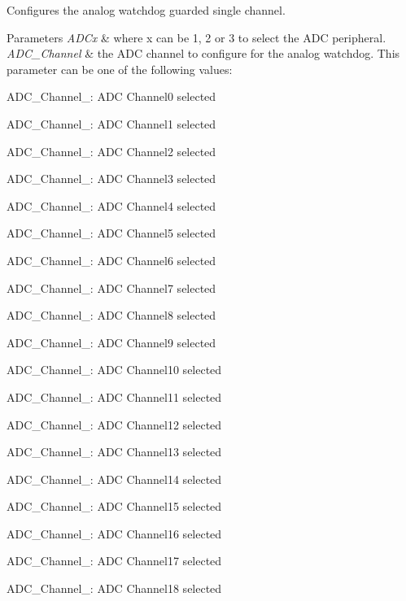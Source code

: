 Configures the analog watchdog guarded single channel. 


\begin{DoxyParams}{Parameters}
{\em A\+D\+Cx} & where x can be 1, 2 or 3 to select the A\+D\+C peripheral. \\
\hline
{\em A\+D\+C\+\_\+\+Channel} & the A\+D\+C channel to configure for the analog watchdog. This parameter can be one of the following values\+: \begin{DoxyItemize}
\item A\+D\+C\+\_\+\+Channel\+\_\+: A\+D\+C Channel0 selected \item A\+D\+C\+\_\+\+Channel\+\_\+: A\+D\+C Channel1 selected \item A\+D\+C\+\_\+\+Channel\+\_\+: A\+D\+C Channel2 selected \item A\+D\+C\+\_\+\+Channel\+\_\+: A\+D\+C Channel3 selected \item A\+D\+C\+\_\+\+Channel\+\_\+: A\+D\+C Channel4 selected \item A\+D\+C\+\_\+\+Channel\+\_\+: A\+D\+C Channel5 selected \item A\+D\+C\+\_\+\+Channel\+\_\+: A\+D\+C Channel6 selected \item A\+D\+C\+\_\+\+Channel\+\_\+: A\+D\+C Channel7 selected \item A\+D\+C\+\_\+\+Channel\+\_\+: A\+D\+C Channel8 selected \item A\+D\+C\+\_\+\+Channel\+\_\+: A\+D\+C Channel9 selected \item A\+D\+C\+\_\+\+Channel\+\_\+: A\+D\+C Channel10 selected \item A\+D\+C\+\_\+\+Channel\+\_\+: A\+D\+C Channel11 selected \item A\+D\+C\+\_\+\+Channel\+\_\+: A\+D\+C Channel12 selected \item A\+D\+C\+\_\+\+Channel\+\_\+: A\+D\+C Channel13 selected \item A\+D\+C\+\_\+\+Channel\+\_\+: A\+D\+C Channel14 selected \item A\+D\+C\+\_\+\+Channel\+\_\+: A\+D\+C Channel15 selected \item A\+D\+C\+\_\+\+Channel\+\_\+: A\+D\+C Channel16 selected \item A\+D\+C\+\_\+\+Channel\+\_\+: A\+D\+C Channel17 selected \item A\+D\+C\+\_\+\+Channel\+\_\+: A\+D\+C Channel18 selected \end{DoxyItemize}
\\
\hline
\end{DoxyParams}

